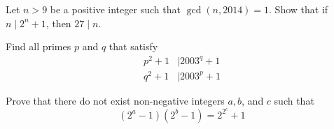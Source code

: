 \documentclass{subfile}
\begin{document}

	\begin{problem}
		Let $n>9$ be a positive integer such that $\gcd(n,2014)=1$. Show that if $n \mid 2^n+1$, then $27 \mid n$. %
	\end{problem}


	\begin{problem}
		Find all primes $p$ and $q$ that satisfy
			\begin{align*}
				p^2+1
					& \mid 2003^q+1\\
				q^2+1
					& \mid 2003^p+1
			\end{align*}
	\end{problem}

	\begin{problem}
		Prove that there do not exist non-negative integers $a,b$, and $c$ such that $$(2^a-1)(2^b-1)=2^{2^c}+1$$ %
	\end{problem}
\end{document}
